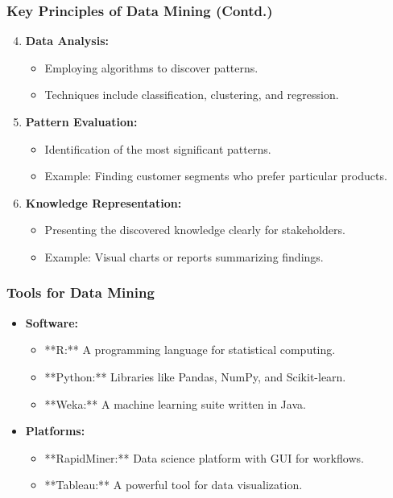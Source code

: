 \documentclass{beamer}
\begin{document}
\begin{frame}[fragile]
    \frametitle{Key Principles of Data Mining (Contd.)}
    \begin{enumerate}
        \setcounter{enumi}{3} %
        \item \textbf{Data Analysis:}
        \begin{itemize}
            \item Employing algorithms to discover patterns.
            \item Techniques include classification, clustering, and regression.
        \end{itemize}

        \item \textbf{Pattern Evaluation:}
        \begin{itemize}
            \item Identification of the most significant patterns.
            \item Example: Finding customer segments who prefer particular products.
        \end{itemize}

        \item \textbf{Knowledge Representation:}
        \begin{itemize}
            \item Presenting the discovered knowledge clearly for stakeholders.
            \item Example: Visual charts or reports summarizing findings.
        \end{itemize}
    \end{enumerate}
\end{frame}

\begin{frame}[fragile]
    \frametitle{Tools for Data Mining}
    \begin{itemize}
        \item \textbf{Software:}
        \begin{itemize}
            \item **R:** A programming language for statistical computing.
            \item **Python:** Libraries like Pandas, NumPy, and Scikit-learn.
            \item **Weka:** A machine learning suite written in Java.
        \end{itemize}

        \item \textbf{Platforms:}
        \begin{itemize}
            \item **RapidMiner:** Data science platform with GUI for workflows.
            \item **Tableau:** A powerful tool for data visualization.
        \end{itemize}
    \end{itemize}
\end{frame}
\end{document}
